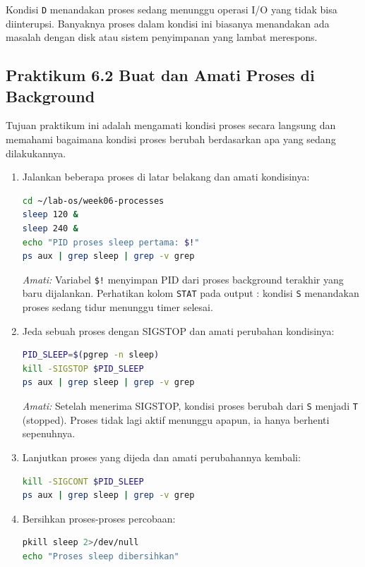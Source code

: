 Kondisi \texttt{D} menandakan proses sedang menunggu operasi I/O yang tidak bisa
diinterupsi. Banyaknya proses dalam kondisi ini biasanya menandakan ada masalah dengan
disk atau sistem penyimpanan yang lambat merespons.

\subsection*{Praktikum 6.2 Buat dan Amati Proses di Background}

Tujuan praktikum ini adalah mengamati kondisi proses secara langsung dan memahami
bagaimana kondisi proses berubah berdasarkan apa yang sedang dilakukannya.

\begin{enumerate}
    \item Jalankan beberapa proses di latar belakang dan amati kondisinya:
\begin{lstlisting}[language=bash, caption={Menjalankan proses di background}]
cd ~/lab-os/week06-processes
sleep 120 &
sleep 240 &
echo "PID proses sleep pertama: $!"
ps aux | grep sleep | grep -v grep
\end{lstlisting}
    \textit{Amati:} Variabel \texttt{\$!} menyimpan PID dari proses background terakhir yang baru dijalankan. Perhatikan kolom \texttt{STAT} pada output : kondisi \texttt{S} menandakan proses sedang tidur menunggu timer selesai.

    \item Jeda sebuah proses dengan SIGSTOP dan amati perubahan kondisinya:
\begin{lstlisting}[language=bash, caption={Menjeda proses dan mengamati perubahan status}]
PID_SLEEP=$(pgrep -n sleep)
kill -SIGSTOP $PID_SLEEP
ps aux | grep sleep | grep -v grep
\end{lstlisting}
    \textit{Amati:} Setelah menerima SIGSTOP, kondisi proses berubah dari \texttt{S} menjadi \texttt{T} (stopped). Proses tidak lagi aktif menunggu apapun, ia hanya berhenti sepenuhnya.

    \item Lanjutkan proses yang dijeda dan amati perubahannya kembali:
\begin{lstlisting}[language=bash, caption={Melanjutkan proses yang dijeda}]
kill -SIGCONT $PID_SLEEP
ps aux | grep sleep | grep -v grep
\end{lstlisting}

    \item Bersihkan proses-proses percobaan:
\begin{lstlisting}[language=bash, caption={Membersihkan proses percobaan}]
pkill sleep 2>/dev/null
echo "Proses sleep dibersihkan"
\end{lstlisting}
\end{enumerate}

